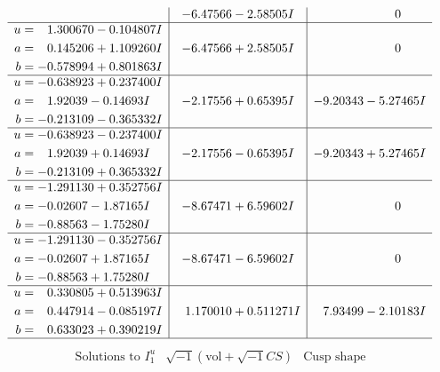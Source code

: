 \documentclass[1p]{elsarticle_modified}
\theoremstyle{definition}
\newcommand{\I}{\sqrt{-1}}
\begin{document}
$$\begin{array}{c|c|c}
 & -6.47566 - 2.58505 I & \phantom{-0.000000 } 0 \\ \hline\begin{aligned}
u &= \phantom{-}1.300670 - 0.104807 I \\
a &= \phantom{-}0.145206 + 1.109260 I \\
b &= -0.578994 + 0.801863 I\end{aligned}
 & -6.47566 + 2.58505 I & \phantom{-0.000000 } 0 \\ \hline\begin{aligned}
u &= -0.638923 + 0.237400 I \\
a &= \phantom{-}1.92039 - 0.14693 I \\
b &= -0.213109 - 0.365332 I\end{aligned}
 & -2.17556 + 0.65395 I & -9.20343 - 5.27465 I \\ \hline\begin{aligned}
u &= -0.638923 - 0.237400 I \\
a &= \phantom{-}1.92039 + 0.14693 I \\
b &= -0.213109 + 0.365332 I\end{aligned}
 & -2.17556 - 0.65395 I & -9.20343 + 5.27465 I \\ \hline\begin{aligned}
u &= -1.291130 + 0.352756 I \\
a &= -0.02607 - 1.87165 I \\
b &= -0.88563 - 1.75280 I\end{aligned}
 & -8.67471 + 6.59602 I & \phantom{-0.000000 } 0 \\ \hline\begin{aligned}
u &= -1.291130 - 0.352756 I \\
a &= -0.02607 + 1.87165 I \\
b &= -0.88563 + 1.75280 I\end{aligned}
 & -8.67471 - 6.59602 I & \phantom{-0.000000 } 0 \\ \hline\begin{aligned}
u &= \phantom{-}0.330805 + 0.513963 I \\
a &= \phantom{-}0.447914 - 0.085197 I \\
b &= \phantom{-}0.633023 + 0.390219 I\end{aligned}
 & \phantom{-}1.170010 + 0.511271 I & \phantom{-}7.93499 - 2.10183 I\\
 \hline 
 \end{array}$$\newpage$$\begin{array}{c|c|c}  
\text{Solutions to }I^u_{1}& \I (\text{vol} + \sqrt{-1}CS) & \text{Cusp shape}\\

\end{array}$$
\end{document}
